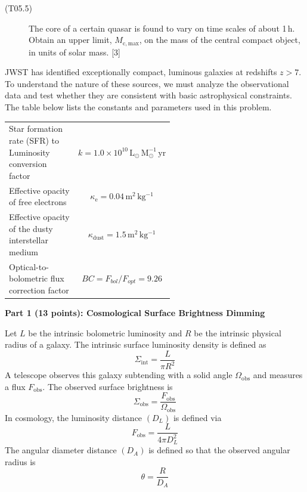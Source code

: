 \begin{description}
\item[(T05.5)] The core of a certain quasar is found to vary on time scales of
  about 1\,h. Obtain an upper limit, $M_{\mathrm{c,max}}$, on the mass of the
  central compact object, in units of solar mass. \hfill[3]
\end{description}

JWST has identified exceptionally compact, luminous galaxies at redshifts
$z > 7$. To understand the nature of these sources, we must analyze the
observational data and test whether they are consistent with basic
astrophysical constraints. The table below lists the constants and parameters
used in this problem.

\begin{center}
\begin{tabular}{p{0.55\linewidth}c}
\toprule
Star formation rate (SFR) to Luminosity conversion factor &
  $k = 1.0 \times 10^{10}\,\mathrm{L_\odot\,M_\odot^{-1}\,yr}$ \\
Effective opacity of free electrons &
  $\kappa_{\mathrm{e}} = 0.04\,\mathrm{m^2\,kg^{-1}}$ \\
Effective opacity of the dusty interstellar medium &
  $\kappa_{\mathrm{dust}} = 1.5\,\mathrm{m^2\,kg^{-1}}$ \\
Optical-to-bolometric flux correction factor &
  $BC = F_{bol}/F_{opt} = 9.26$ \\
\bottomrule
\end{tabular}
\end{center}

\medskip\noindent\textbf{Part 1 (13 points): Cosmological Surface Brightness Dimming}

Let $L$ be the intrinsic bolometric luminosity and $R$ be the intrinsic
physical radius of a galaxy. The intrinsic surface luminosity density is
defined as
\[ \Sigma_{\mathrm{int}} = \frac{L}{\pi R^2} \]
A telescope observes this galaxy subtending with a solid angle
$\Omega_{\mathrm{obs}}$ and measures a flux $F_{\mathrm{obs}}$. The observed
surface brightness is
\[ \Sigma_{\mathrm{obs}} = \frac{F_{\mathrm{obs}}}{\Omega_{\mathrm{obs}}} \]
In cosmology, the luminosity distance $(D_L)$ is defined via
\[ F_{\mathrm{obs}} = \frac{L}{4\pi D_L^2} \]
The angular diameter distance $(D_A)$ is defined so that the observed angular
radius is
\[ \theta = \frac{R}{D_A} \]

